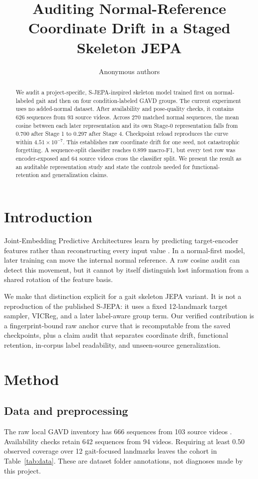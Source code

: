 \documentclass[10pt,twocolumn]{article}
\title{Auditing Normal-Reference Coordinate Drift in a Staged Skeleton JEPA}
\author{Anonymous authors}
\date{}
\begin{document}
\maketitle

\begin{abstract}
We audit a project-specific, S-JEPA-inspired skeleton model trained first on normal-labeled gait and then on four condition-labeled GAVD groups. The current experiment uses no added-normal dataset. After availability and pose-quality checks, it contains 626 sequences from 93 source videos. Across 270 matched normal sequences, the mean cosine between each later representation and its own Stage-0 representation falls from 0.700 after Stage 1 to 0.297 after Stage 4. Checkpoint reload reproduces the curve within $4.51\times10^{-7}$. This establishes raw coordinate drift for one seed, not catastrophic forgetting. A sequence-split classifier reaches 0.899 macro-F1, but every test row was encoder-exposed and 64 source videos cross the classifier split. We present the result as an auditable representation study and state the controls needed for functional-retention and generalization claims.
\end{abstract}

\section{Introduction}
Joint-Embedding Predictive Architectures learn by predicting target-encoder features rather than reconstructing every input value \cite{assran2023ijepa,bardes2024vjepa,abdelfattah2024sjepa}. In a normal-first model, later training can move the internal normal reference. A raw cosine audit can detect this movement, but it cannot by itself distinguish lost information from a shared rotation of the feature basis.

We make that distinction explicit for a gait skeleton JEPA variant. It is not a reproduction of the published S-JEPA: it uses a fixed 12-landmark target sampler, VICReg, and a later label-aware group term. Our verified contribution is a fingerprint-bound raw anchor curve that is recomputable from the saved checkpoints, plus a claim audit that separates coordinate drift, functional retention, in-corpus label readability, and unseen-source generalization.

\section{Method}
\subsection{Data and preprocessing}
The raw local GAVD inventory has 666 sequences from 103 source videos \cite{ranjan2025gavd}. Availability checks retain 642 sequences from 94 videos. Requiring at least 0.50 observed coverage over 12 gait-focused landmarks leaves the cohort in Table~\ref{tab:data}. These are dataset folder annotations, not diagnoses made by this project.
\end{document}
